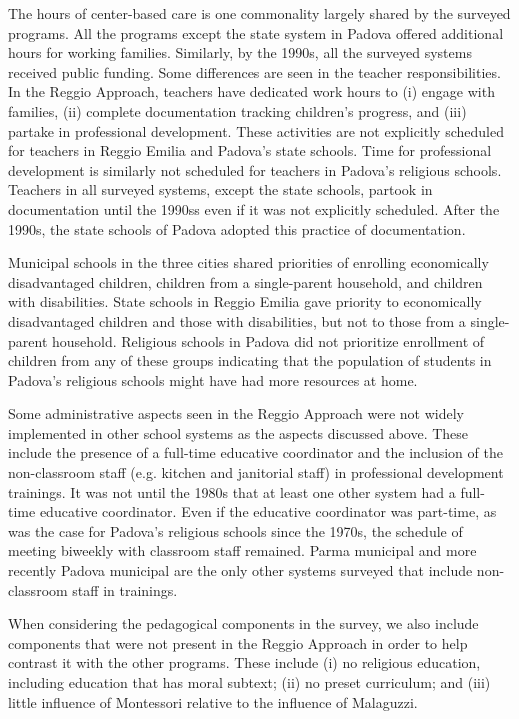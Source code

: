 The hours of center-based care is one commonality largely shared by the surveyed programs. All the programs except the state system in Padova offered additional hours for working families. Similarly, by the 1990s, all the surveyed systems received public funding. Some differences are seen in the teacher responsibilities. In the Reggio Approach, teachers have dedicated work hours to (i) engage with families, (ii) complete documentation tracking children's progress, and (iii) partake in professional development. These activities are not explicitly scheduled for teachers in Reggio Emilia and Padova's state schools. Time for professional development is similarly not scheduled for teachers in Padova's religious schools. Teachers in all surveyed systems, except the state schools, partook in documentation until the 1990ss even if it was not explicitly scheduled. After the 1990s, the state schools of Padova adopted this practice of documentation.

Municipal schools in the three cities shared priorities of enrolling economically disadvantaged children, children from a single-parent household, and children with disabilities. State schools in Reggio Emilia gave priority to economically disadvantaged children and those with disabilities, but not to those from a single-parent household. Religious schools in Padova did not prioritize enrollment of children from any of these groups indicating that the population of students in Padova's religious schools might have had more resources at home. %

Some administrative aspects seen in the Reggio Approach were not widely implemented in other school systems as the aspects discussed above. These include the presence of a full-time educative coordinator and the inclusion of the non-classroom staff (e.g. kitchen and janitorial staff) in professional development trainings. It was not until the 1980s that at least one other system had a full-time educative coordinator. Even if the educative coordinator was part-time, as was the case for Padova's religious schools since the 1970s, the schedule of meeting biweekly with classroom staff remained. Parma municipal and more recently Padova municipal are the only other systems surveyed that include non-classroom staff in trainings.

When considering the pedagogical components in the survey, we also include components that were not present in the Reggio Approach in order to help contrast it with the other programs. These include (i) no religious education, including education that has moral subtext; (ii) no preset curriculum; and (iii) little influence of Montessori relative to the influence of Malaguzzi. 

